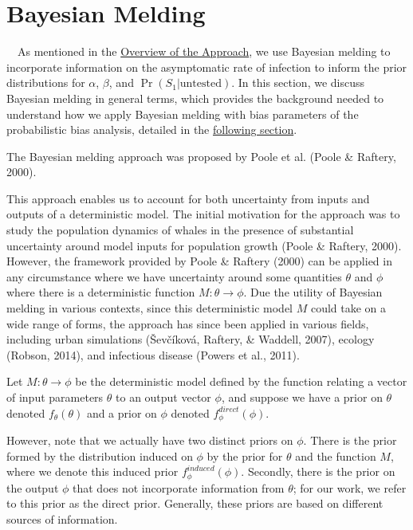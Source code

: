 \documentclass[12pt,twoside]{smiththesis}
\begin{document}
\hypertarget{bayesian-melding}{%
\section{Bayesian Melding}\label{bayesian-melding}}

~~As mentioned in the \protect\hyperlink{overview}{Overview of the Approach}, we use Bayesian melding to incorporate information on the asymptomatic rate of infection to inform the prior distributions for \(\alpha\), \(\beta\), and \(\Pr(S_1|\text{untested})\). In this section, we discuss Bayesian melding in general terms, which provides the background needed to understand how we apply Bayesian melding with bias parameters of the probabilistic bias analysis, detailed in the \protect\hyperlink{meld}{following section}.

The Bayesian melding approach was proposed by Poole et al. (Poole \& Raftery, 2000).

This approach enables us to account for both uncertainty from inputs and outputs of a deterministic model. The initial motivation for the approach was to study the population dynamics of whales in the presence of substantial uncertainty around model inputs for population growth (Poole \& Raftery, 2000). However, the framework provided by Poole \& Raftery (2000) can be applied in any circumstance where we have uncertainty around some quantities \(\theta\) and \(\phi\) where there is a deterministic function \(M:\theta \to\phi\). Due the utility of Bayesian melding in various contexts, since this deterministic model \(M\) could take on a wide range of forms, the approach has since been applied in various fields, including urban simulations (Ševčíková, Raftery, \& Waddell, 2007), ecology (Robson, 2014), and infectious disease (Powers et al., 2011).

Let \(M: \theta \to \phi\) be the deterministic model defined by the function relating a vector of input parameters \(\theta\) to an output vector \(\phi\), and suppose we have a prior on \(\theta\) denoted \(f_\theta(\theta)\) and a prior on \(\phi\) denoted \(f_\phi^{direct}(\phi)\).

However, note that we actually have two distinct priors on \(\phi\). There is the prior formed by the distribution induced on \(\phi\) by the prior for \(\theta\) and the function \(M\), where we denote this induced prior \(f_\phi^{induced}(\phi)\). Secondly, there is the prior on the output \(\phi\) that does not incorporate information from \(\theta\); for our work, we refer to this prior as the direct prior. Generally, these priors are based on different sources of information.
\end{document}
